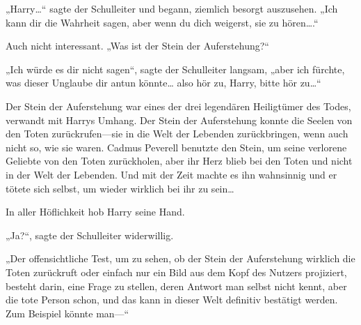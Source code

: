 „Harry…“ sagte der Schulleiter und begann, ziemlich besorgt auszusehen. „Ich kann dir die Wahrheit sagen, aber wenn du dich weigerst, sie zu hören….“

Auch nicht interessant. „Was ist der Stein der Auferstehung?“

„Ich würde es dir nicht sagen“, sagte der Schulleiter langsam, „aber ich fürchte, was dieser Unglaube dir antun könnte… also hör zu, Harry, bitte hör zu…“

Der Stein der Auferstehung war eines der drei legendären Heiligtümer des Todes, verwandt mit Harrys Umhang. Der Stein der Auferstehung konnte die Seelen von den Toten zurückrufen—sie in die Welt der Lebenden zurückbringen, wenn auch nicht so, wie sie waren. Cadmus Peverell benutzte den Stein, um seine verlorene Geliebte von den Toten zurückholen, aber ihr Herz blieb bei den Toten und nicht in der Welt der Lebenden. Und mit der Zeit machte es ihn wahnsinnig und er tötete sich selbst, um wieder wirklich bei ihr zu sein…

In aller Höflichkeit hob Harry seine Hand.

„Ja?“, sagte der Schulleiter widerwillig.

„Der offensichtliche Test, um zu sehen, ob der Stein der Auferstehung wirklich die Toten zurückruft oder einfach nur ein Bild aus dem Kopf des Nutzers projiziert, besteht darin, eine Frage zu stellen, deren Antwort man selbst nicht kennt, aber die tote Person schon, und das kann in dieser Welt definitiv bestätigt werden. Zum Beispiel könnte man—“


